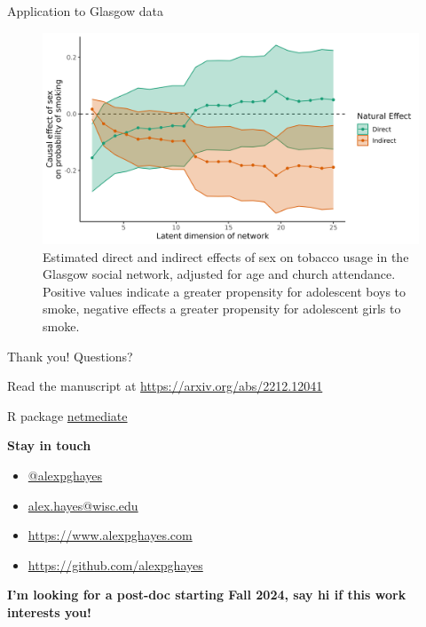 \documentclass[aspectratio=169]{beamer}
\theoremstyle{remark}
\begin{document}
\begin{frame}{Application to Glasgow data}


    \begin{figure}
        \centering
        \includegraphics[width=.7\textwidth]{figures/glasgow/effects.png}
        \caption{\footnotesize Estimated direct and indirect effects of sex on tobacco usage in the Glasgow social network, adjusted for age and church attendance. Positive values indicate a greater propensity for adolescent boys to smoke, negative effects a greater propensity for adolescent girls to smoke.}
        \label{fig:glasgow-estimates}
    \end{figure}
\end{frame}

\begin{frame}{Thank you! Questions?}

    Read the manuscript at \url{https://arxiv.org/abs/2212.12041}

    R package \href{https://github.com/alexpghayes/netmediate}{netmediate}

    \textbf{Stay in touch}

    \begin{itemize}
        \item[]  \href{https://twitter.com/alexpghayes}{@alexpghayes}
        \item[]  \href{mailto:alex.hayes@wisc.edu}{alex.hayes@wisc.edu}
        \item[]  \url{https://www.alexpghayes.com} %
        \item[]  \url{https://github.com/alexpghayes}
    \end{itemize}

    \textbf{I'm looking for a post-doc starting Fall 2024, say hi if this work interests you!}
\end{frame}
\end{document}
